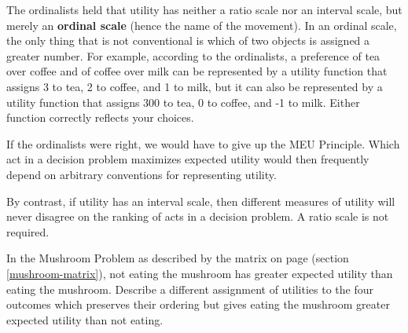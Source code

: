 The ordinalists held that utility has neither a ratio scale nor an
interval scale, but merely an \textbf{ordinal scale} (hence the name
of the movement). In an ordinal scale, the only thing that is not
conventional is which of two objects is assigned a greater number. For
example, according to the ordinalists, a preference of tea over coffee
and of coffee over milk can be represented by a utility function that
assigns 3 to tea, 2 to coffee, and 1 to milk, but it can also be
represented by a utility function that assigns 300 to tea, 0 to
coffee, and -1 to milk. Either function correctly reflects your
choices.

If the ordinalists were right, we would have to give up the MEU
Principle. Which act in a decision problem maximizes expected utility
would then frequently depend on arbitrary conventions for representing
utility.

By contrast, if utility has an interval scale, then different measures
of utility will never disagree on the ranking of acts in a decision
problem. A ratio scale is not required. 

\begin{exercise}{1}
  In the Mushroom Problem as described by the matrix on page
  \pageref{mushroom-matrix} (section \ref{mushroom-matrix}), not
  eating the mushroom has greater expected utility than eating the
  mushroom. Describe a different assignment of utilities to the four
  outcomes which preserves their ordering but gives eating the mushroom
  greater expected utility than not eating.
\end{exercise}




